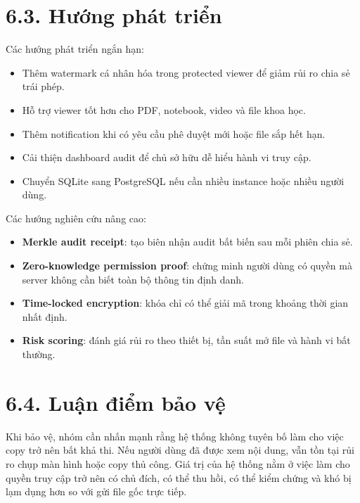 \section*{6.3. Hướng phát triển}
{}

Các hướng phát triển ngắn hạn:

\begin{itemize}
  \item Thêm watermark cá nhân hóa trong protected viewer để giảm rủi ro chia sẻ trái phép.
  \item Hỗ trợ viewer tốt hơn cho PDF, notebook, video và file khoa học.
  \item Thêm notification khi có yêu cầu phê duyệt mới hoặc file sắp hết hạn.
  \item Cải thiện dashboard audit để chủ sở hữu dễ hiểu hành vi truy cập.
  \item Chuyển SQLite sang PostgreSQL nếu cần nhiều instance hoặc nhiều người dùng.
\end{itemize}

Các hướng nghiên cứu nâng cao:

\begin{itemize}
  \item \textbf{Merkle audit receipt}: tạo biên nhận audit bất biến sau mỗi phiên chia sẻ.
  \item \textbf{Zero-knowledge permission proof}: chứng minh người dùng có quyền mà server không cần biết toàn bộ thông tin định danh.
  \item \textbf{Time-locked encryption}: khóa chỉ có thể giải mã trong khoảng thời gian nhất định.
  \item \textbf{Risk scoring}: đánh giá rủi ro theo thiết bị, tần suất mở file và hành vi bất thường.
\end{itemize}

\section*{6.4. Luận điểm bảo vệ}
{}

Khi bảo vệ, nhóm cần nhấn mạnh rằng hệ thống không tuyên bố làm cho việc copy trở nên bất khả thi. Nếu người dùng đã được xem nội dung, vẫn tồn tại rủi ro chụp màn hình hoặc copy thủ công. Giá trị của hệ thống nằm ở việc làm cho quyền truy cập trở nên có chủ đích, có thể thu hồi, có thể kiểm chứng và khó bị lạm dụng hơn so với gửi file gốc trực tiếp.

\clearpage

